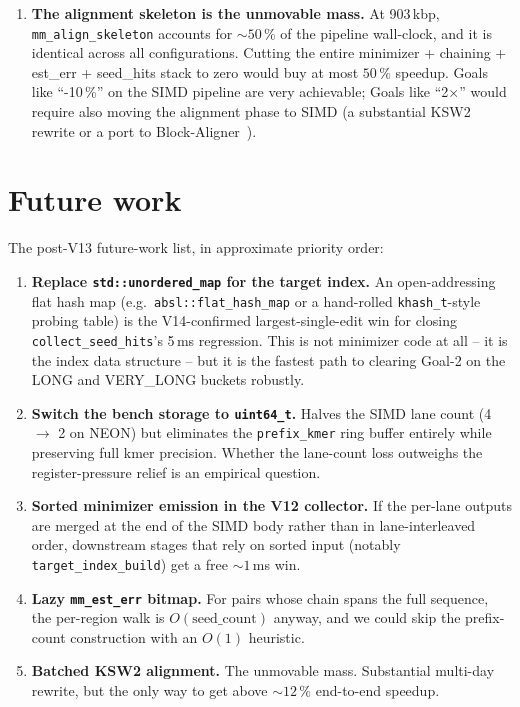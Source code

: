 \begin{enumerate}
\item \textbf{The alignment skeleton is the unmovable mass.}
  At 903\,kbp, \texttt{mm\_align\_skeleton} accounts for $\sim 50\,\%$
  of the pipeline wall-clock, and it is identical across all
  configurations.  Cutting the entire minimizer + chaining +
  est\_err + seed\_hits stack to zero would buy at most $50\,\%$
  speedup.  Goals like ``-10\,\%'' on the SIMD pipeline are very
  achievable; Goals like ``2$\times$'' would require also moving
  the alignment phase to SIMD (a substantial KSW2 rewrite or a
  port to Block-Aligner~\cite{block_aligner_paper}).
\end{enumerate}

\section{Future work}
\label{sec:future-work}

The post-V13 future-work list, in approximate priority order:

\begin{enumerate}
\item \textbf{Replace \texttt{std::unordered\_map} for the target
  index.}  An open-addressing flat hash map (e.g.\
  \texttt{absl::flat\_hash\_map} or a hand-rolled
  \texttt{khash\_t}-style probing table) is the V14-confirmed
  largest-single-edit win for closing
  \texttt{collect\_seed\_hits}'s 5\,ms regression.  This is
  not minimizer code at all -- it is the index data structure --
  but it is the fastest path to clearing Goal-2 on the LONG and
  VERY\_LONG buckets robustly.
\item \textbf{Switch the bench storage to \texttt{uint64\_t}.}
  Halves the SIMD lane count (4 $\to$ 2 on NEON) but eliminates the
  \texttt{prefix\_kmer} ring buffer entirely while preserving full
  kmer precision.  Whether the lane-count loss outweighs the
  register-pressure relief is an empirical question.
\item \textbf{Sorted minimizer emission in the V12 collector.}  If
  the per-lane outputs are merged at the end of the SIMD body
  rather than in lane-interleaved order, downstream stages that
  rely on sorted input (notably \texttt{target\_index\_build}) get
  a free $\sim 1$\,ms win.
\item \textbf{Lazy \texttt{mm\_est\_err} bitmap.}  For pairs whose
  chain spans the full sequence, the per-region walk is
  $O(\text{seed\_count})$ anyway, and we could skip the
  prefix-count construction with an $O(1)$ heuristic.
\item \textbf{Batched KSW2 alignment.}  The unmovable mass.
  Substantial multi-day rewrite, but the only way to get above
  $\sim 12\,\%$ end-to-end speedup.
\end{enumerate}

